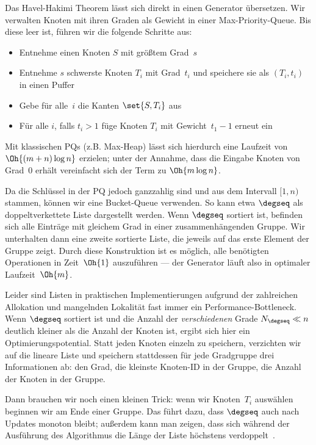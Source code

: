 Das Havel-Hakimi Theorem lässt sich direkt in einen Generator übersetzen.
Wir verwalten Knoten mit ihren Graden als Gewicht in einer Max-Priority-Queue.
Bis diese leer ist, führen wir die folgende Schritte aus:
\begin{itemize}
    \item Entnehme einen Knoten $S$ mit größtem Grad~$s$
    \item Entnehme $s$ schwerste Knoten $T_i$ mit Grad~$t_i$ und speichere sie als $(T_i, t_i)$ in einen Puffer
    \item Gebe für alle~$i$ die Kanten $\set{S, T_i}$ aus
    \item Für alle $i$, falls $t_i > 1$ füge Knoten $T_i$ mit Gewicht~$t_1 - 1$ erneut ein
\end{itemize}

Mit klassischen PQs (z.B. Max-Heap) lässt sich hierdurch eine Laufzeit von $\Oh{(m + n) \log n}$ erzielen;
unter der Annahme, dass die Eingabe Knoten von Grad~0 erhält vereinfacht sich der Term zu $\Oh{m \log n}$.

Da die Schlüssel in der PQ jedoch ganzzahlig sind und aus dem Intervall $[1, n)$ stammen, können wir eine Bucket-Queue verwenden.
So kann etwa $\degseq$ als doppeltverkettete Liste dargestellt werden.
Wenn $\degseq$ sortiert ist, befinden sich alle Einträge mit gleichem Grad in einer zusammenhängenden Gruppe.
Wir unterhalten dann eine zweite sortierte Liste, die jeweils auf das erste Element der Gruppe zeigt.
Durch diese Konstruktion ist es möglich, alle benötigten Operationen in Zeit~$\Oh{1}$ auszuführen --- der Generator läuft also in optimaler Laufzeit~$\Oh{m}$.

Leider sind Listen in praktischen Implementierungen aufgrund der zahlreichen Allokation und mangelnden Lokalität fast immer ein Performance-Bottleneck.
Wenn $\degseq$ sortiert ist und die Anzahl der \emph{verschiedenen} Grade $N_\degseq \ll n$ deutlich kleiner als die Anzahl der Knoten ist, ergibt sich hier ein Optimierungspotential.
Statt jeden Knoten einzeln zu speichern, verzichten wir auf die  lineare Liste und speichern stattdessen für jede Gradgruppe drei Informationen ab:
den Grad, die kleinste Knoten-ID in der Gruppe, die Anzahl der Knoten in der Gruppe.

Dann brauchen wir noch einen kleinen Trick: wenn wir Knoten~$T_i$ auswählen beginnen wir am Ende einer Gruppe.
Das führt dazu, dass $\degseq$ auch nach Updates monoton bleibt; außerdem kann man zeigen, dass sich während der Ausführung des Algorithmus die Länge der Liste höchstens verdoppelt~\cite{DBLP:journals/jea/HamannMPTW18}.

